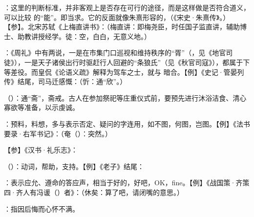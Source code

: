 {
\item {}：这里的判断标准，并非客观上是否存在可行的途径，而是这样做是否符合道义，可以比较  的“能”。即当求。它的反面就像朱熹形容的，（《宋史·朱熹传》。）【参】。北宋苏轼《上梅直讲书》：（梅直讲：即梅尧臣，时任国子监直讲，辅助博士、助教讲授经学。徒：空，白白，无意义地。）
\item {}：《周礼》中有两说，一是在市集门口巡视和维持秩序的“胥”（，见《地官司徒》），一是天子诸侯出行时驱赶行人回避的“条狼氏”（见《秋官司寇》），都属于下等差役。而皇侃《论语义疏》解释为驾车之士，就与  暗合。【例】《史记·管晏列传》结尾，司马迁感慨：（忻：通“欣”。）
}
{}


{
\item {}（）：通“斋”，斋戒。古人在参加祭祀等庄重仪式前，要预先进行沐浴洁食、清心寡欲等准备，以示虔诚。
}
{}


{
\item {}：预料，料想，多与表示否定、疑问的字连用，如不图，何图，岂图。【例】《法书要录·右军书记》：（奄（）：突然。）%

【参】《汉书·礼乐志》：
}
{}


{
\item {}（）：动词，帮助，支持。【例】《老子》结尾：
\item {}：表示应允、遵命的答应声，相当于好的，好吧，OK，fine。【例】《战国策·齐策四·齐人有冯谖（）者》：（休矣：算了吧，请闭嘴的意思。）
\item {}：指因后悔而心怀不满。
}
{}  %


